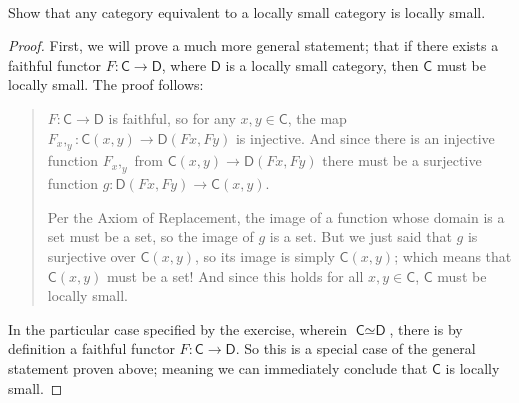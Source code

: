 \documentclass[main.tex]{subfiles}
\begin{document}
\paragraph{}
\begin{exercise}
	Show that any category equivalent to a locally small category is locally
	small.
\end{exercise}

\begin{proof}
	First, we will prove a much more general statement; that if there exists a
	faithful functor \(F \colon \textsf{C} \to \textsf{D}\), where
	\(\textsf{D}\) is a locally small category, then \(\textsf{C}\) must be
	locally small. The proof follows:

\begin{quotation}
	\(F \colon \textsf{C} \to \textsf{D}\) is faithful, so for any \(x, y \in
	\textsf{C}\), the map \(F_x,_y \colon \textsf{C}(x, y) \to \textsf{D}(Fx,
	Fy)\) is injective. And since there is an injective function \(F_x,_y\) from
	\(\textsf{C}(x, y) \to \textsf{D}(Fx, Fy)\) there must be a surjective
	function \(g \colon \textsf{D}(Fx, Fy) \to \textsf{C}(x,
	y)\)\footnotemark[1].
	
	Per the Axiom of Replacement, the image of a function whose domain is a set
	must be a set, so the image of \(g\) is a set. But we just said that \(g\)
	is surjective over \(\textsf{C}(x, y)\), so its image is simply
	\(\textsf{C}(x, y)\); which means that \(\textsf{C}(x, y)\) must be a set!
	And since this holds for all \(x, y \in \textsf{C}\), \(\textsf{C}\) must be
	locally small.
\end{quotation}

In the particular case specified by the exercise, wherein \(\textsf{C} \simeq
\textsf{D}\), there is by definition a faithful functor \(F \colon \textsf{C}
\to \textsf{D}\). So this is a special case of the general statement proven
above; meaning we can immediately conclude that \(\textsf{C}\) is locally small.

\end{proof}
\end{document}
